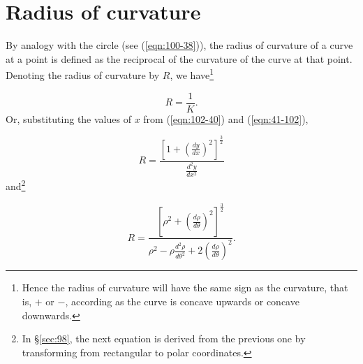 \section{Radius of curvature}
\label{sec:103}

By analogy with the circle (see (\ref{eqn:100-38})), %
the radius of curvature of a curve at a point is defined as 
the reciprocal of the curvature of the curve at that 
point. Denoting the radius of curvature by $R$, 
we have\footnote{Hence the radius of curvature will 
have the same sign as the curvature, that is, $+$ or $-$, 
according as the curve is concave upwards or concave downwards.}

\[
R = \frac{1}{K}.
\]
Or, substituting the values of $x$ from 
(\ref{eqn:102-40}) and (\ref{eqn:41-102}),

\begin{equation}
R = \frac{ \left[ 1 
+ \left( \frac{dy}{dx} \right)^2 \right]^{\frac{3}{2}} }{ 
\frac{d^2 y}{dx^2} }
\label{eqn:103-42}
\end{equation}
and\footnote{In \S \ref{sec:98}, %
the next equation is derived from the previous one 
by transforming from rectangular to polar coordinates.}

\begin{equation}
R = \frac{ \left[ \rho^2 
+ \left( \frac{d\rho}{d\theta} \right)^2 \right]^{\frac{3}{2}} }{ 
\rho^2 - \rho \frac{d^2 \rho}{d\theta^2} 
+ 2 \left( \frac{d\rho}{d\theta} \right)^2 }.
\label{eqn:43-103}
\end{equation}

